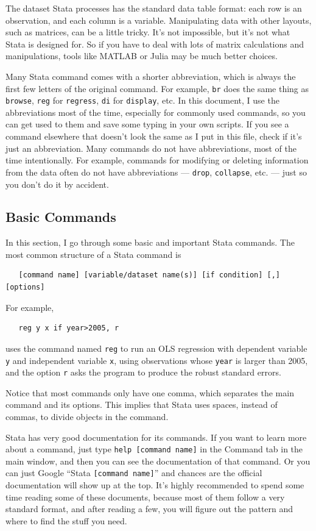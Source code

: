 The dataset Stata processes has the standard data table format: each row is an observation, and each column is a variable. Manipulating data with other layouts, such as matrices, can be a little tricky. It's not impossible, but it's not what Stata is designed for. So if you have to deal with lots of matrix calculations and manipulations, tools like MATLAB or Julia may be much better choices. 

Many Stata command comes with a shorter abbreviation, which is always the first few letters of the original command. For example, \verb|br| does the same thing as \verb|browse|, \verb|reg| for \verb|regress|, \verb|di| for \verb|display|, etc. In this document, I use the abbreviations most of the time, especially for commonly used commands, so you can get used to them and save some typing in your own scripts. If you see a command elsewhere that doesn't look the same as I put in this file, check if it's just an abbreviation. Many commands do not have abbreviations, most of the time intentionally. For example, commands for modifying or deleting information from the data often do not have abbreviations --- \verb|drop|,  \verb|collapse|, etc. --- just so you don't do it by accident.  

\subsection{Basic Commands}
\label{sec_basic_commands}
In this section, I go through some basic and important Stata commands. The most common structure of a Stata command is 
\begin{verbatim}
   [command name] [variable/dataset name(s)] [if condition] [,] [options] 
\end{verbatim}
For example, 
\begin{verbatim}
   reg y x if year>2005, r
\end{verbatim}
uses the command named \verb|reg| to run an OLS regression with dependent variable \verb|y| and independent variable \verb|x|, using observations whose \verb|year| is larger than 2005, and the option \verb|r| asks the program to produce the robust standard errors. 

Notice that most commands only have one comma, which separates the main command and its options. This implies that Stata uses spaces, instead of commas, to divide objects in the command. 

Stata has very good documentation for its commands. If you want to learn more about a command, just type \verb|help [command name]| in the Command tab in the main window, and then you can see the documentation of that command. Or you can just Google ``Stata \verb|[command name]|'' and chances are the official documentation will show up at the top. It's highly recommended to spend some time reading some of these documents, because most of them follow a very standard format, and after reading a few, you will figure out the pattern and where to find the stuff you need. 

